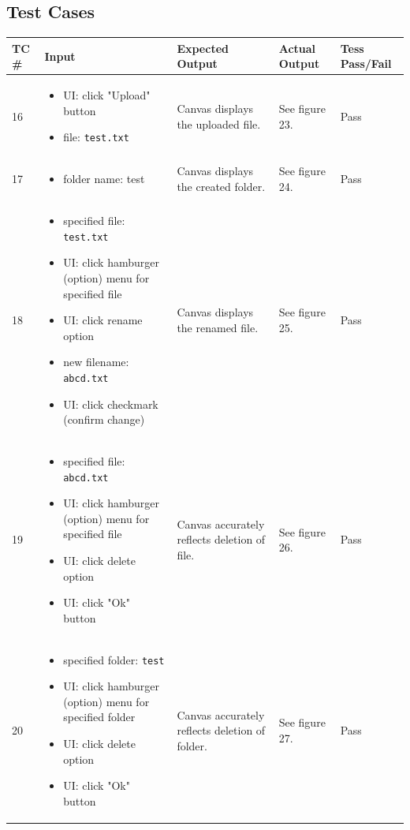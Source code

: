 \documentclass[10pt,letterpaper]{article}
\begin{document}
\subsection{Test Cases}
\begin{table}[h!]
\begin{tabularx}{\textwidth}{lXXXl}
\toprule
TC \# &
  Input &
  Expected Output &
  Actual Output &
  Tess Pass/Fail \\ \midrule
16 &
  \begin{itemize}
    \item{UI: click "Upload" button}
    \item{file: \texttt{test.txt}}
  \end{itemize} &
   Canvas displays the uploaded file. &
   See figure 23. &
   Pass \\ \midrule
17 &
  \begin{itemize}
    \item{folder name: test}
  \end{itemize} &
   Canvas displays the created folder. &
   See figure 24. &
   Pass \\ \midrule
18 &
  \begin{itemize}
    \item{specified file: \texttt{test.txt}}
    \item{UI: click hamburger (option) menu for specified file}
    \item{UI: click rename option}
    \item{new filename: \texttt{abcd.txt}}
    \item{UI: click checkmark (confirm change)}
  \end{itemize} &
   Canvas displays the renamed file. &
   See figure 25. &
   Pass \\ \midrule
19 &
  \begin{itemize}
    \item{specified file: \texttt{abcd.txt}}
    \item{UI: click hamburger (option) menu for specified file}
    \item{UI: click delete option}
    \item{UI: click "Ok" button}
  \end{itemize} &
   Canvas accurately reflects deletion of file. &
   See figure 26. &
   Pass \\ \midrule
20 &
  \begin{itemize}
    \item{specified folder: \texttt{test}}
    \item{UI: click hamburger (option) menu for specified folder}
    \item{UI: click delete option}
    \item{UI: click "Ok" button}
  \end{itemize} &
   Canvas accurately reflects deletion of folder. &
   See figure 27. &
   Pass \\ \bottomrule
\end{tabularx}
\end{table}
\end{document}
